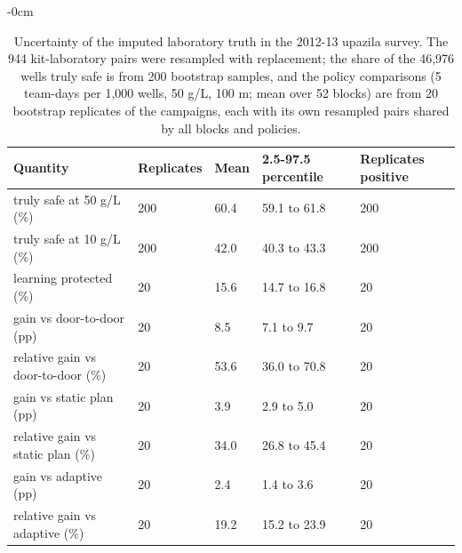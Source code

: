 \documentclass[sustainability,article,submit,pdftex,moreauthors]{Definitions/mdpi}
\begin{document}
\begin{table}[H]
\caption{Uncertainty of the imputed laboratory truth in the 2012-13 upazila survey. The 944 kit-laboratory pairs were resampled with replacement; the share of the 46,976 wells truly safe is from 200 bootstrap samples, and the policy comparisons (5 team-days per 1,000 wells, 50 \textmu{}g/L, 100 m; mean over 52 blocks) are from 20 bootstrap replicates of the campaigns, each with its own resampled pairs shared by all blocks and policies.}
\label{apptab8}
\scriptsize\setlength{\tabcolsep}{3pt}
\begin{adjustwidth}{-\extralength}{0cm}\centering
\begin{tabular}{L{5.0cm}R{1.6cm}R{1.4cm}R{2.6cm}R{2.0cm}}
\toprule
\textbf{Quantity} & \textbf{Replicates} & \textbf{Mean} & \textbf{2.5-97.5 percentile} & \textbf{Replicates positive} \\
\midrule
truly safe at 50 \textmu{}g/L (\%) & 200 & 60.4 & 59.1 to 61.8 & 200 \\
truly safe at 10 \textmu{}g/L (\%) & 200 & 42.0 & 40.3 to 43.3 & 200 \\
learning protected (\%) & 20 & 15.6 & 14.7 to 16.8 & 20 \\
gain vs door-to-door (pp) & 20 & 8.5 & 7.1 to 9.7 & 20 \\
relative gain vs door-to-door (\%) & 20 & 53.6 & 36.0 to 70.8 & 20 \\
gain vs static plan (pp) & 20 & 3.9 & 2.9 to 5.0 & 20 \\
relative gain vs static plan (\%) & 20 & 34.0 & 26.8 to 45.4 & 20 \\
gain vs adaptive (pp) & 20 & 2.4 & 1.4 to 3.6 & 20 \\
relative gain vs adaptive (\%) & 20 & 19.2 & 15.2 to 23.9 & 20 \\
\bottomrule
\end{tabular}
\end{adjustwidth}
\end{table}
\end{document}
